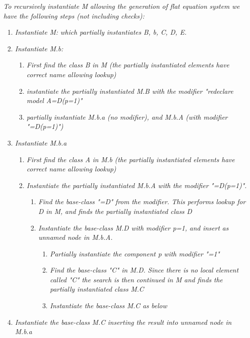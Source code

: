 \emph{To recursively instantiate M allowing the generation of flat
equation system we have the following steps (not including checks):}

\begin{enumerate}
\item
  \emph{Instantiate M: which partially instantiates B, b, C, D, E.}
\item
  \emph{Instantiate M.b: }

  \begin{enumerate}
  \item
    \emph{First find the class B in M (the partially instantiated
    elements have correct name allowing lookup)}
  \item
    \emph{instantiate the partially instantiated M.B with the modifier
    "redeclare model A=D(p=1)"}
  \item
    \emph{partially instantiate M.b.a (no modifier), and M.b.A (with
    modifier "=D(p=1)")}
  \end{enumerate}
\item
  \emph{Instantiate M.b.a}

  \begin{enumerate}
  \item
    \emph{First find the class A in M.b (the partially instantiated
    elements have correct name allowing lookup)}
  \item
    \emph{Instantiate the partially instantiated M.b.A with the modifier
    "=D(p=1)".}

    \begin{enumerate}
    \item
      \emph{Find the base-class "=D" from the modifier. This performs
      lookup for D in M, and finds the partially instantiated class D}
    \item
      \emph{Instantiate the base-class M.D with modifier p=1, and insert
      as unnamed node in M.b.A.}

      \begin{enumerate}
      \item
        \emph{Partially instantiate the component p with modifier "=1"}
      \item
        \emph{Find the base-class "C" in M.D. Since there is no local
        element called "C" the search is then continued in M and finds
        the partially instantiated class M.C}
      \item
        \emph{Instantiate the base-class M.C as below}
      \end{enumerate}
    \end{enumerate}
  \end{enumerate}
\item
  \emph{Instantiate the base-class M.C inserting the result into unnamed
  node in M.b.a}


\end{enumerate}
